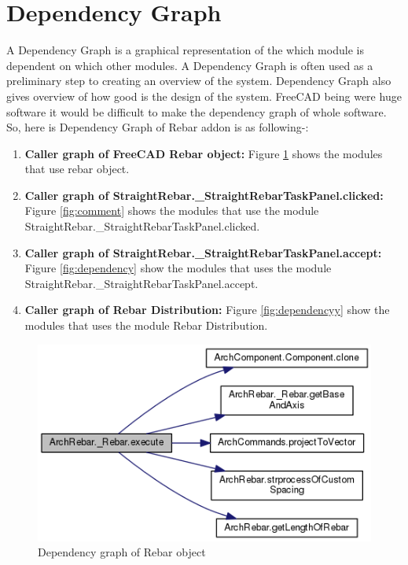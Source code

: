 \section{Dependency Graph}
A Dependency Graph is a graphical representation of the which module is dependent on which other modules. A Dependency Graph is often used as a preliminary step to creating an overview of the system. Dependency Graph also gives overview of how good is the design of the system.
FreeCAD being were huge software it would be difficult to make the dependency graph of whole software. So, here is  Dependency Graph of Rebar addon is as following-:
\begin{enumerate}
\item \textbf{Caller graph of FreeCAD Rebar object:} Figure \ref{fig:comment1} shows the modules that use rebar object.
\item \textbf{Caller graph of StraightRebar.\_StraightRebarTaskPanel.clicked:} Figure \ref{fig:comment} shows the modules that use the module StraightRebar.\_StraightRebarTaskPanel.clicked.
\item \textbf{Caller graph of StraightRebar.\_StraightRebarTaskPanel.accept:} Figure \ref{fig:dependency} show the modules that uses the module StraightRebar.\_StraightRebarTaskPanel.accept.
\item \textbf{Caller graph of Rebar Distribution:} Figure \ref{fig:dependencyy} show the modules that uses the module Rebar Distribution.
\end{enumerate}

\begin{figure}
	\centering
	\includegraphics[scale=.8]{images/rebarobject.png}
	\caption{Dependency graph of Rebar object}
	\label{fig:comment1}
\end{figure}

